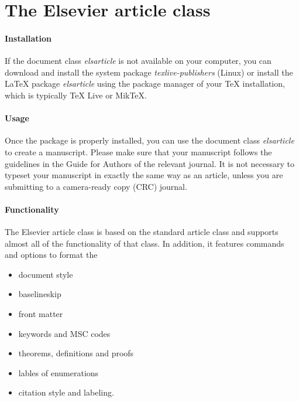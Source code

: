 \documentclass[]{elsarticle} %
\begin{document}
\hypertarget{the-elsevier-article-class}{%
\section{The Elsevier article class}\label{the-elsevier-article-class}}

\hypertarget{installation}{%
\paragraph{Installation}\label{installation}}

If the document class \emph{elsarticle} is not available on your
computer, you can download and install the system package
\emph{texlive-publishers} (Linux) or install the LaTeX package
\emph{elsarticle} using the package manager of your TeX installation,
which is typically TeX Live or MikTeX.

\hypertarget{usage}{%
\paragraph{Usage}\label{usage}}

Once the package is properly installed, you can use the document class
\emph{elsarticle} to create a manuscript. Please make sure that your
manuscript follows the guidelines in the Guide for Authors of the
relevant journal. It is not necessary to typeset your manuscript in
exactly the same way as an article, unless you are submitting to a
camera-ready copy (CRC) journal.

\hypertarget{functionality}{%
\paragraph{Functionality}\label{functionality}}

The Elsevier article class is based on the standard article class and
supports almost all of the functionality of that class. In addition, it
features commands and options to format the

\begin{itemize}
\item
  document style
\item
  baselineskip
\item
  front matter
\item
  keywords and MSC codes
\item
  theorems, definitions and proofs
\item
  lables of enumerations
\item
  citation style and labeling.
\end{itemize}
\end{document}
